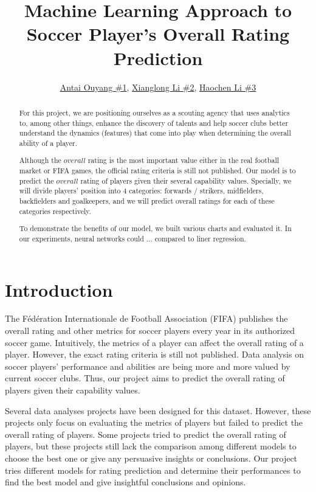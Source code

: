 \documentclass{article}
\title{Machine Learning Approach to Soccer Player's Overall Rating Prediction}
\author{\href{mailto:ao2186@nyu.edu}{Antai Ouyang \#1}, \href{mailto:xl3215@nyu.edu}{Xianglong Li \#2}, \href{mailto:hl4151@nyu.edu}{Haochen Li \#3}}
\date{\vspace{-5ex}} %
\begin{document}
\maketitle
\thispagestyle{firstpage}


\begin{abstract}
    
    
    For this project, we are positioning ourselves as a scouting agency that uses analytics to, among other things, enhance the discovery of talents and help soccer clubs better understand the dynamics (features) that come into play when determining the overall ability of a player. 
    
    Although the $overall$ rating is the most important value either in the real football market or FIFA games, the official rating criteria is still not published. Our model is to predict the $overall$ rating of players given their several capability values. Specially, we will divide players' position into 4 categories: forwards / strikers, midfielders, backfielders and goalkeepers, and we will predict overall ratings for each of these categories respectively.
    
    To demonstrate the benefits of our model, we built various charts and evaluated it. In our experiments, neural networks could ... compared to liner regression.
    
\end{abstract}


\section*{Introduction}
The Fédération Internationale de Football Association (FIFA) publishes the overall rating and other metrics for soccer players every year in its authorized soccer game. Intuitively, the metrics of a player can affect the overall rating of a player. However, the exact rating criteria is still not published. Data analysis on soccer players' performance and abilities are being more and more valued by current soccer clubs. Thus, our project aims to predict the overall rating of players given their capability values.

Several data analyses projects have been designed for this dataset. However, these projects only focus on evaluating the metrics of players but failed to predict
the overall rating of players. Some projects tried to predict the overall rating of players, but these projects still lack the comparison among different models
to choose the best one or give any persuasive insights or conclusions. Our project tries different models for rating prediction and determine their performances to find the best model and give insightful conclusions and opinions.
\end{document}
